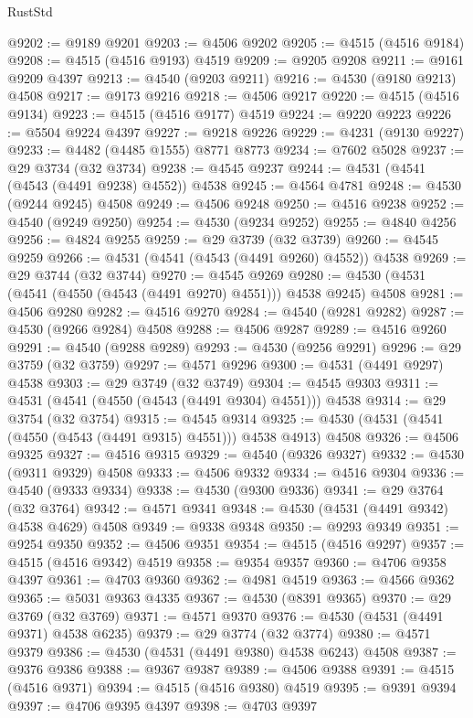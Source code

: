\begin{lexlean}{RustStd}
\begin{coremodule}
@9202 := @9189 @9201
@9203 := @4506 @9202
@9205 := @4515 (@4516 @9184)
@9208 := @4515 (@4516 @9193) @4519
@9209 := @9205 @9208
@9211 := @9161 @9209 @4397
@9213 := @4540 (@9203 @9211)
@9216 := @4530 (@9180 @9213) @4508
@9217 := @9173 @9216
@9218 := @4506 @9217
@9220 := @4515 (@4516 @9134)
@9223 := @4515 (@4516 @9177) @4519
@9224 := @9220 @9223
@9226 := @5504 @9224 @4397
@9227 := @9218 @9226
@9229 := @4231 (@9130 @9227)
@9233 := @4482 (@4485 @1555) @8771 @8773
@9234 := @7602 @5028
@9237 := @29 @3734 (@32 @3734)
@9238 := @4545 @9237
@9244 := @4531 (@4541 (@4543 (@4491 @9238) @4552)) @4538
@9245 := @4564 @4781
@9248 := @4530 (@9244 @9245) @4508
@9249 := @4506 @9248
@9250 := @4516 @9238
@9252 := @4540 (@9249 @9250)
@9254 := @4530 (@9234 @9252)
@9255 := @4840 @4256
@9256 := @4824 @9255
@9259 := @29 @3739 (@32 @3739)
@9260 := @4545 @9259
@9266 := @4531 (@4541 (@4543 (@4491 @9260) @4552)) @4538
@9269 := @29 @3744 (@32 @3744)
@9270 := @4545 @9269
@9280 := @4530 (@4531 (@4541 (@4550 (@4543 (@4491 @9270) @4551))) @4538 @9245) @4508
@9281 := @4506 @9280
@9282 := @4516 @9270
@9284 := @4540 (@9281 @9282)
@9287 := @4530 (@9266 @9284) @4508
@9288 := @4506 @9287
@9289 := @4516 @9260
@9291 := @4540 (@9288 @9289)
@9293 := @4530 (@9256 @9291)
@9296 := @29 @3759 (@32 @3759)
@9297 := @4571 @9296
@9300 := @4531 (@4491 @9297) @4538
@9303 := @29 @3749 (@32 @3749)
@9304 := @4545 @9303
@9311 := @4531 (@4541 (@4550 (@4543 (@4491 @9304) @4551))) @4538
@9314 := @29 @3754 (@32 @3754)
@9315 := @4545 @9314
@9325 := @4530 (@4531 (@4541 (@4550 (@4543 (@4491 @9315) @4551))) @4538 @4913) @4508
@9326 := @4506 @9325
@9327 := @4516 @9315
@9329 := @4540 (@9326 @9327)
@9332 := @4530 (@9311 @9329) @4508
@9333 := @4506 @9332
@9334 := @4516 @9304
@9336 := @4540 (@9333 @9334)
@9338 := @4530 (@9300 @9336)
@9341 := @29 @3764 (@32 @3764)
@9342 := @4571 @9341
@9348 := @4530 (@4531 (@4491 @9342) @4538 @4629) @4508
@9349 := @9338 @9348
@9350 := @9293 @9349
@9351 := @9254 @9350
@9352 := @4506 @9351
@9354 := @4515 (@4516 @9297)
@9357 := @4515 (@4516 @9342) @4519
@9358 := @9354 @9357
@9360 := @4706 @9358 @4397
@9361 := @4703 @9360
@9362 := @4981 @4519
@9363 := @4566 @9362
@9365 := @5031 @9363 @4335
@9367 := @4530 (@8391 @9365)
@9370 := @29 @3769 (@32 @3769)
@9371 := @4571 @9370
@9376 := @4530 (@4531 (@4491 @9371) @4538 @6235)
@9379 := @29 @3774 (@32 @3774)
@9380 := @4571 @9379
@9386 := @4530 (@4531 (@4491 @9380) @4538 @6243) @4508
@9387 := @9376 @9386
@9388 := @9367 @9387
@9389 := @4506 @9388
@9391 := @4515 (@4516 @9371)
@9394 := @4515 (@4516 @9380) @4519
@9395 := @9391 @9394
@9397 := @4706 @9395 @4397
@9398 := @4703 @9397

\end{coremodule}
\end{lexlean}
